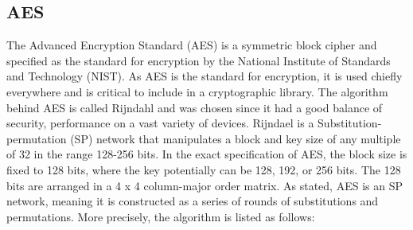\documentclass[a4paper]{article}
\begin{document}
\subsection{AES}
\label{AESalg}
The Advanced Encryption Standard (AES) is a symmetric block cipher and specified as the standard for encryption by the National Institute of Standards and Technology (NIST). As AES is the standard for encryption, it is used chiefly everywhere and is critical to include in a cryptographic library. The algorithm behind AES is called Rijndahl and was chosen since it had a good balance of security, performance on a vast variety of devices\cite{AESofficial}. Rijndael is a Substitution-permutation (SP) network that manipulates a block and key size of any multiple of 32 in the range 128-256 bits. In the exact specification of AES, the block size is fixed to 128 bits, where the key potentially can be 128, 192, or 256 bits. The 128 bits are arranged in a 4 x 4 column-major order matrix. As stated, AES is an SP network, meaning it is constructed as a series of rounds of substitutions and permutations. More precisely, the algorithm is listed as follows:
\end{document}
